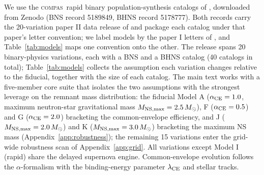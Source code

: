 \documentclass[twocolumn,amsmath]{aastex702}
\newcommand{\Msun}{M_\odot}
\newcommand{\compas}{\textsc{compas}}
\begin{document}
We use the \compas\ rapid binary population-synthesis catalogs of
\citet{broekgaarden2021,broekgaarden2022}, downloaded from Zenodo (BNS record
5189849, BHNS record 5178777). Both records carry the 20-variation paper II
data release of \citet{broekgaarden2022} and package each catalog under that
paper's letter convention; we label models by the paper I letters of
\citet{broekgaarden2021}, and Table~\ref{tab:models} maps one convention onto
the other. The release spans 20 binary-physics variations, each with a BNS
and a BHNS catalog (40 catalogs in total); Table~\ref{tab:models} collects
the assumption each variation changes relative to the fiducial, together
with the size of each catalog. The main text works with a five-member core
suite that isolates the two assumptions with the strongest leverage on the remnant
mass distribution: the fiducial Model A ($\alpha_{\rm CE} = 1.0$, maximum
neutron-star gravitational mass $M_{\rm NS,max} = 2.5\,\Msun$), F
($\alpha_{\rm CE} = 0.5$) and G ($\alpha_{\rm CE} = 2.0$) bracketing the
common-envelope efficiency, and J ($M_{\rm NS,max} = 2.0\,\Msun$) and K
($M_{\rm NS,max} = 3.0\,\Msun$) bracketing the maximum NS mass
(Appendix~\ref{app:robustness}); the remaining 15 variations enter the
grid-wide robustness scan of Appendix~\ref{app:grid}. All variations except
Model I (rapid) share the \citet{fryer2012} delayed supernova engine.
Common-envelope evolution follows the \citet{webbink1984} $\alpha$-formalism
with the \citet{xuli2010} binding-energy parameter $\lambda_{\rm CE}$ and
\citet{hurley2002} stellar tracks.
\end{document}
